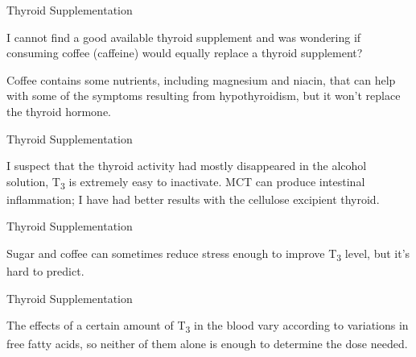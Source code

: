 \documentclass[11pt,oneside,openany,extrafontsizes]{memoir}
\begin{document}
\begin{qaexchange}{Thyroid Supplementation}

    \begin{question}
        I cannot find a good available thyroid supplement and was wondering if consuming coffee (caffeine) would equally replace a thyroid supplement?
    \end{question}

    \begin{answer}
      Coffee contains some nutrients, including magnesium and niacin, that can help with some of the symptoms resulting from hypothyroidism, but it won't replace the thyroid hormone.
    \end{answer}
\end{qaexchange}

\begin{standalonequote}{Thyroid Supplementation}

    \begin{answer}
       I suspect that the thyroid activity had mostly disappeared in the alcohol solution, T\textsubscript{3} is extremely easy to inactivate. MCT can produce intestinal inflammation; I have had better results with the cellulose excipient thyroid.
    \end{answer}
\end{standalonequote}

\begin{standalonequote}{Thyroid Supplementation}

    \begin{answer}
      Sugar and coffee can sometimes reduce stress enough to improve T\textsubscript{3} level, but it's hard to predict.
    \end{answer}
\end{standalonequote}

\begin{standalonequote}{Thyroid Supplementation}

    \begin{answer}
      The effects of a certain amount of T\textsubscript{3} in the blood vary according to variations in free fatty acids, so neither of them alone is enough to determine the dose needed.
    \end{answer}
\end{standalonequote}
\end{document}
